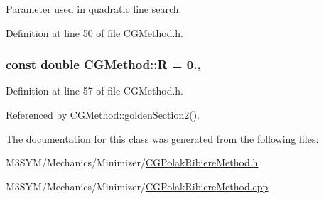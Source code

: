 Parameter used in quadratic line search. 



Definition at line 50 of file C\+G\+Method.\+h.

\hypertarget{classCGMethod_a2e7906b4b29a1b76dca43d56eaf2efac}{
\subsubsection[{R}]{\setlength{\rightskip}{0pt plus 5cm}const double C\+G\+Method\+::\+R = 0.\hspace{0.3cm}{\ttfamily [protected]}, {\ttfamily [inherited]}}}\label{classCGMethod_a2e7906b4b29a1b76dca43d56eaf2efac}


Definition at line 57 of file C\+G\+Method.\+h.



Referenced by C\+G\+Method\+::golden\+Section2().



The documentation for this class was generated from the following files\+:\begin{DoxyCompactItemize}
\item 
M3\+S\+Y\+M/\+Mechanics/\+Minimizer/\hyperlink{CGPolakRibiereMethod_8h}{C\+G\+Polak\+Ribiere\+Method.\+h}\item 
M3\+S\+Y\+M/\+Mechanics/\+Minimizer/\hyperlink{CGPolakRibiereMethod_8cpp}{C\+G\+Polak\+Ribiere\+Method.\+cpp}\end{DoxyCompactItemize}
